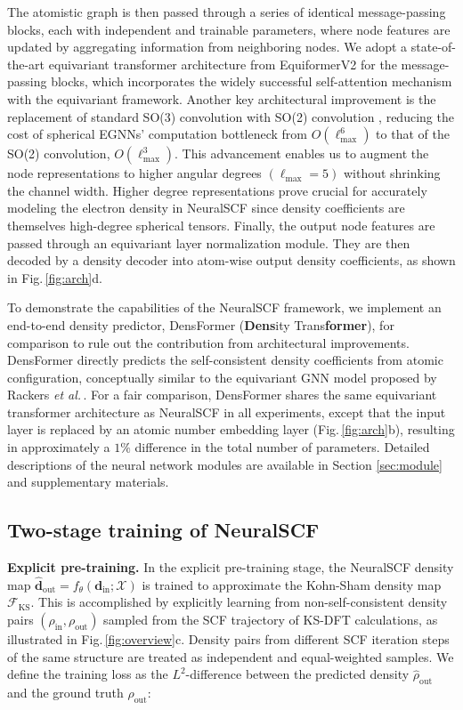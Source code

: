 \documentclass[%
reprint,
superscriptaddress,
bibnotes,
amsmath,amssymb,
aps,
floatfix, %
]{revtex4-2}
\begin{document}
The atomistic graph is then passed through a series of identical message-passing blocks, each with independent and trainable parameters, where node features are updated by aggregating information from neighboring nodes. We adopt a state-of-the-art equivariant transformer architecture from EquiformerV2 \cite{liao2023equiformerv2} for the message-passing blocks, which incorporates the widely successful self-attention mechanism \cite{vaswani2017attention} with the equivariant framework. Another key architectural improvement is the replacement of standard SO(3) convolution with SO(2) convolution \cite{passaro23escn}, reducing the cost of spherical EGNNs' computation bottleneck from $O(\ell_\text{max}^6)$ to that of the SO(2) convolution, $O(\ell_\text{max}^3)$. This advancement enables us to augment the node representations to higher angular degrees $(\ell_\text{max}=5)$ without shrinking the channel width. Higher degree representations prove crucial for accurately modeling the electron density in NeuralSCF since density coefficients are themselves high-degree spherical tensors. Finally, the output node features are passed through an equivariant layer normalization module. They are then decoded by a density decoder into atom-wise output density coefficients, as shown in Fig.\,\ref{fig:arch}d. 

To demonstrate the capabilities of the NeuralSCF framework, we implement an end-to-end density predictor, DensFormer (\textbf{Dens}ity Trans\textbf{former}), for comparison to rule out the contribution from architectural improvements. DensFormer directly predicts the self-consistent density coefficients from atomic configuration, conceptually similar to the equivariant GNN model proposed by Rackers \textit{et al.}\,\cite{rackers2023}. For a fair comparison, DensFormer shares the same equivariant transformer architecture as NeuralSCF in all experiments, except that the input layer is replaced by an atomic number embedding layer (Fig.\,\ref{fig:arch}b), resulting in approximately a $1\%$ difference in the total number of parameters. Detailed descriptions of the neural network modules are available in Section \ref{sec:module} and supplementary materials.

\subsection{\label{sec:train}Two-stage training of NeuralSCF}

\noindent\textbf{Explicit pre-training.} In the explicit pre-training stage, the NeuralSCF density map $\hat{\mathbf{d}}_\text{out} = f_{\theta}(\mathbf{d}_\text{in};\mathcal{X})$ is trained to approximate the Kohn-Sham density map $\mathcal{F}_\text{KS}$. This is accomplished by explicitly learning from non-self-consistent density pairs $(\rho_\text{in}, \rho_\text{out})$ sampled from the SCF trajectory of KS-DFT calculations, as illustrated in Fig.\,\ref{fig:overview}c. Density pairs from different SCF iteration steps of the same structure are treated as independent and equal-weighted samples. We define the training loss as the $L^2$-difference between the predicted density $\hat{\rho}_\text{out}$ and the ground truth $\rho_\text{out}$:
\end{document}

